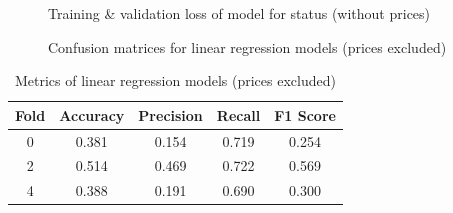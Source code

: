 \documentclass[12pt,twoside]{report}
\begin{document}
\begin{figure}[h]
	\hfil
	\caption{Training \& validation loss of model for status (without prices)}
	\label{linear_regression_status_exclude_full}
\end{figure}

\begin{figure}[!htbp]
	\centering
	\hfill
	\hfill
	\caption{Confusion matrices for linear regression models (prices excluded)}
	\label{cm_excluded}
\end{figure}

\begin{table}[!htbp]
	\centering
	\caption{Metrics of linear regression models (prices excluded)}
	\label{metrics_linear_regression_status_excluded}
	\begin{tabular}{| c | c | c | c | c |}
		\hline
		Fold & Accuracy & Precision & Recall & F1 Score \\
		\hline
		0 & 0.381 & 0.154 & 0.719 & 0.254 \\
		\hline
		2 & 0.514 & 0.469 & 0.722 & 0.569 \\
		\hline
		4 & 0.388 & 0.191 & 0.690 & 0.300 \\
		\hline
	\end{tabular}
\end{table}
\end{document}
